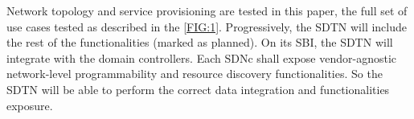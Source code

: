 \documentclass[10pt, conference]{IEEEtran}
\begin{document}



Network topology and service provisioning are tested in this paper, the full set of use cases tested as described in the \cref{FIG:1}. Progressively, the SDTN  will include the rest of the functionalities (marked as planned). On its SBI, the SDTN  will integrate with the domain controllers. Each SDNc shall expose vendor-agnostic network-level programmability and resource discovery functionalities. So the SDTN  will be able to perform the correct data integration and functionalities exposure.
\end{document}
